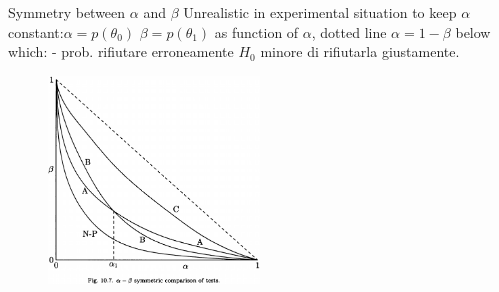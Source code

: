 \documentclass[asd-beamer.tex]{subfiles}%
\begin{document}
\begin{frame}{Symmetry between $\alpha$ and $\beta$}
Unrealistic in experimental situation to keep $\alpha$ constant:$\alpha=p(\theta_0)$ $\beta=p(\theta_1)$ as function of $\alpha$, dotted line $\alpha=1-\beta$ below which:  - prob. rifiutare erroneamente $H_0$ minore di rifiutarla giustamente.
\begin{figure}[!ht]\includegraphics[trim={0cm 0cm 0 0},clip, keepaspectratio,width=0.5\textwidth]{figures/james/test/testabsym}\label{fig:testabsym}\end{figure}
\end{frame}
\end{document}
